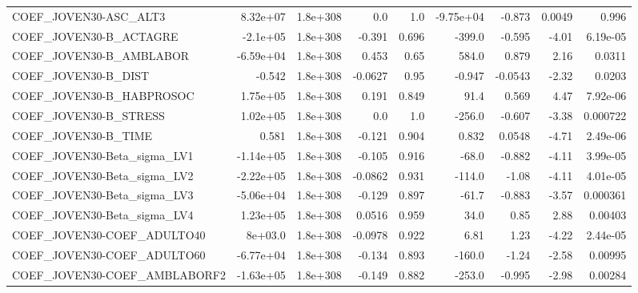 \begin{tabular}{lrrrrrrrr}
COEF\_JOVEN30-ASC\_ALT3             &    8.32e+07 &     1.8e+308 &     0.0 &      1.0 &  -9.75e+04 &      -0.873 &       0.0049 &         0.996 \\
COEF\_JOVEN30-B\_ACTAGRE            &    -2.1e+05 &     1.8e+308 &  -0.391 &    0.696 &     -399.0 &      -0.595 &        -4.01 &      6.19e-05 \\
COEF\_JOVEN30-B\_AMBLABOR           &   -6.59e+04 &     1.8e+308 &   0.453 &     0.65 &      584.0 &       0.879 &         2.16 &        0.0311 \\
COEF\_JOVEN30-B\_DIST               &      -0.542 &     1.8e+308 & -0.0627 &     0.95 &     -0.947 &     -0.0543 &        -2.32 &        0.0203 \\
COEF\_JOVEN30-B\_HABPROSOC          &    1.75e+05 &     1.8e+308 &   0.191 &    0.849 &       91.4 &       0.569 &         4.47 &      7.92e-06 \\
COEF\_JOVEN30-B\_STRESS             &    1.02e+05 &     1.8e+308 &     0.0 &      1.0 &     -256.0 &      -0.607 &        -3.38 &      0.000722 \\
COEF\_JOVEN30-B\_TIME               &       0.581 &     1.8e+308 &  -0.121 &    0.904 &      0.832 &      0.0548 &        -4.71 &      2.49e-06 \\
COEF\_JOVEN30-Beta\_sigma\_LV1       &   -1.14e+05 &     1.8e+308 &  -0.105 &    0.916 &      -68.0 &      -0.882 &        -4.11 &      3.99e-05 \\
COEF\_JOVEN30-Beta\_sigma\_LV2       &   -2.22e+05 &     1.8e+308 & -0.0862 &    0.931 &     -114.0 &       -1.08 &        -4.11 &      4.01e-05 \\
COEF\_JOVEN30-Beta\_sigma\_LV3       &   -5.06e+04 &     1.8e+308 &  -0.129 &    0.897 &      -61.7 &      -0.883 &        -3.57 &      0.000361 \\
COEF\_JOVEN30-Beta\_sigma\_LV4       &    1.23e+05 &     1.8e+308 &  0.0516 &    0.959 &       34.0 &        0.85 &         2.88 &       0.00403 \\
COEF\_JOVEN30-COEF\_ADULTO40        &     8e+03.0 &     1.8e+308 & -0.0978 &    0.922 &       6.81 &        1.23 &        -4.22 &      2.44e-05 \\
COEF\_JOVEN30-COEF\_ADULTO60        &   -6.77e+04 &     1.8e+308 &  -0.134 &    0.893 &     -160.0 &       -1.24 &        -2.58 &       0.00995 \\
COEF\_JOVEN30-COEF\_AMBLABORF2      &   -1.63e+05 &     1.8e+308 &  -0.149 &    0.882 &     -253.0 &      -0.995 &        -2.98 &       0.00284 \\

\end{tabular}
